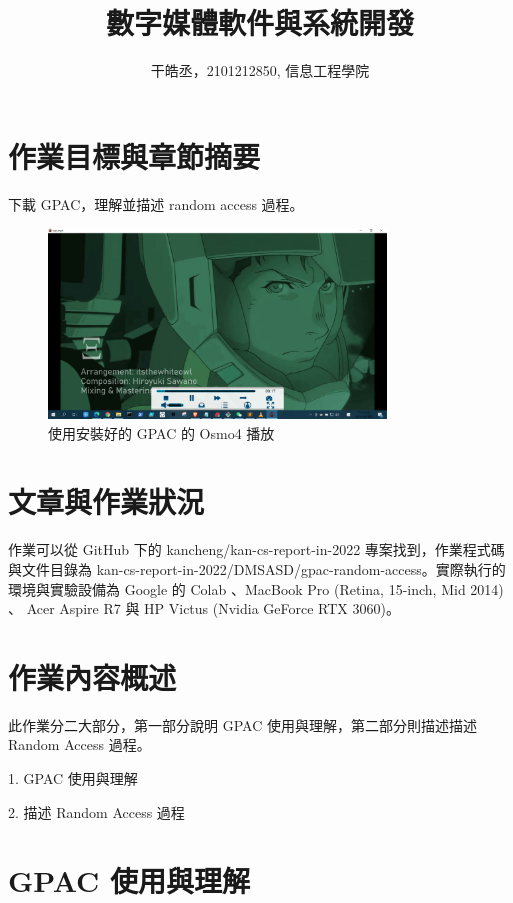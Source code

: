 \documentclass[10pt,UTF8]{ctexart}
\title{數字媒體軟件與系統開發}
\author{干皓丞，2101212850, 信息工程學院}
\begin{document}
\maketitle


\section{作業目標與章節摘要}

下載 GPAC，理解並描述 random access 過程。

\begin{figure}[H]
\centering 
\includegraphics[width=0.80\textwidth]{g2.png} 
\caption{使用安裝好的 GPAC 的 Osmo4 播放}
\label{Test}
\end{figure}


\section{文章與作業狀況}

作業可以從 GitHub 下的 kancheng/kan-cs-report-in-2022 專案找到，作業程式碼與文件目錄為 kan-cs-report-in-2022/DMSASD/gpac-random-access。實際執行的環境與實驗設備為 Google 的 Colab 、MacBook Pro (Retina, 15-inch, Mid 2014) 、 Acer Aspire R7 與 HP Victus (Nvidia GeForce RTX 3060)。


\section{作業內容概述}

此作業分二大部分，第一部分說明 GPAC 使用與理解，第二部分則描述描述 Random Access 過程。

1. GPAC 使用與理解

2. 描述 Random Access 過程

\section{GPAC 使用與理解}
\end{document}
